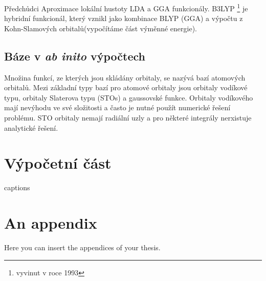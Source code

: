 \documentclass[
  digital, %
  table,   %
  lof,     %
  lot,     %
]{fithesis3}
\begin{document}
Předchůdci Aproximace lokální hustoty LDA a GGA funkcionály. B3LYP \footnote{vyvinut v roce 1993} je hybridní funkcionál, který vznikl jako kombinace BLYP (GGA) a výpočtu z Kohn-Slamových orbitalů(vypočítáme část výměnné energie).


\section{Báze v \textit{ab inito} výpočtech }\label{kapitola_baze}
Množina funkcí, ze kterých jsou skládány orbitaly, se nazývá bazí atomových orbitalů. Mezi základní typy bazí pro atomové orbitaly jsou orbitaly vodíkové typu, orbitaly Slaterova typu (STOs) a gaussovské funkce. \cite{dftshrnutivysledky}
Orbitaly vodíkového mají nevýhodu ve své složitosti a často je nutné použít numerické řešení problému. STO orbitaly nemají radiální uzly a pro některé integrály nerxistuje analytické řešení.


\chapter{Výpočetní část}

{\csname captions\languagename\endcsname %
\makeatletter %
  \thesis@selectLocale{\thesis@locale}\makeatother
\printbibliography[heading=bibintoc]} %
\appendix %
\chapter{An appendix}
Here you can insert the appendices of your thesis.   
\end{document}
